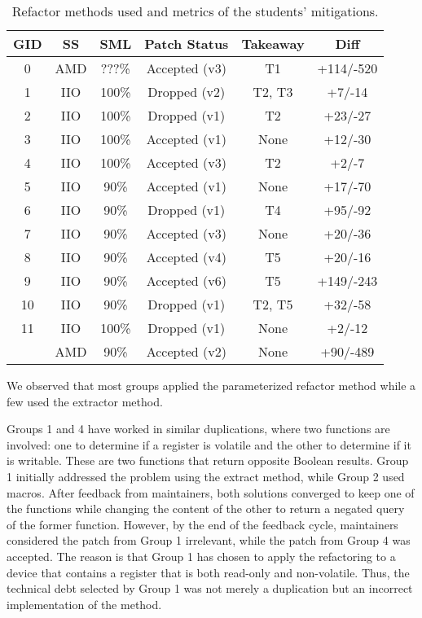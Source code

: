 \documentclass[10pt,conference]{IEEEtran}
\begin{document}
\begin{table}[ht]
\centering
\caption{Refactor methods used and metrics of the students' mitigations.}
\begin{tabular}{ |c |c |c |c |c | c| }
\hline
\textbf{GID} & \textbf{SS} & \textbf{SML} & \textbf{Patch Status} & \textbf{Takeaway} & \textbf{Diff} \\
\hline
0 & AMD & ???\% & Accepted (v3) & T1 & +114/-520 \\ \hline
1 & IIO & 100\% & Dropped (v2) & T2, T3 & +7/-14 \\ \hline
2 & IIO & 100\% & Dropped (v1) & T2 & +23/-27 \\ \hline
3 & IIO & 100\% & Accepted (v1) & None & +12/-30 \\ \hline
4 & IIO & 100\% & Accepted (v3) & T2 & +2/-7 \\ \hline
5 & IIO & 90\% & Accepted (v1) & None & +17/-70 \\ \hline
6 & IIO & 90\% & Dropped (v1) & T4 & +95/-92 \\ \hline
7 & IIO & 90\% & Accepted (v3) & None & +20/-36 \\ \hline
8 & IIO & 90\% & Accepted (v4) & T5 & +20/-16 \\ \hline
9 & IIO & 90\% & Accepted (v6) & T5 & +149/-243 \\ \hline
10 & IIO & 90\% & Dropped (v1) & T2, T5 & +32/-58 \\ \hline
11 & IIO & 100\% & Dropped (v1) & None & +2/-12 \\
   & AMD & 90\% & Accepted (v2) & None & +90/-489 \\ \hline

\end{tabular}%

\label{tab:stu}
\end{table}

We observed that most groups applied the parameterized refactor method while a few used the extractor method.

Groups 1 and 4 have worked in similar duplications, where two functions are involved: one to determine if a register is volatile and the other to determine if it is writable. These are two functions that return opposite Boolean results. Group 1 initially addressed the problem using the extract method, while Group 2 used macros. After feedback from maintainers, both solutions converged to keep one of the functions while changing the content of the other to return a negated query of the former function. However, by the end of the feedback cycle, maintainers considered the patch from Group 1 irrelevant, while the patch from Group 4 was accepted. The reason is that Group 1 has chosen to apply the refactoring to a device that contains a register that is both read-only and non-volatile. Thus, the technical debt selected by Group 1 was not merely a duplication but an incorrect implementation of the method.
\end{document}
